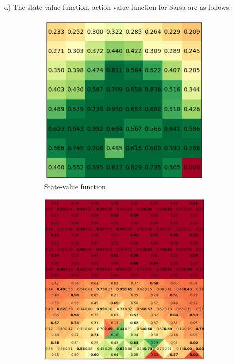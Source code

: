 \documentclass{article}
\begin{document}
\begin{enumerate}
\begin{figure}[H]
\end{figure}
\item[d)]The state-value function, action-value function for Sarsa are as follows:
\begin{figure}[H]
	\begin{subfigure}[b]{0.5\linewidth}
		\includegraphics[width = \linewidth]{SarsaV3.jpg}
		\caption{State-value function}
	\end{subfigure}
	\begin{subfigure}[b]{0.5\linewidth}
		\includegraphics[width = \linewidth]{SarsaQ3.jpg}

\end{subfigure}
\end{figure}
\end{enumerate}
\end{document}
